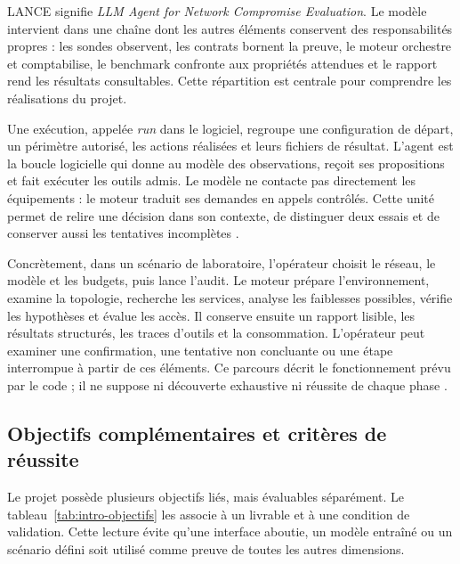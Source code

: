 \documentclass[11pt,a4paper]{article}
\begin{document}
LANCE signifie \emph{LLM Agent for Network Compromise Evaluation}. Le modèle
intervient dans une chaîne dont les autres éléments conservent des
responsabilités propres : les sondes observent, les contrats bornent la preuve,
le moteur orchestre et comptabilise, le benchmark confronte aux propriétés
attendues et le rapport rend les résultats consultables. Cette répartition est
centrale pour comprendre les réalisations du projet.

Une exécution, appelée \emph{run} dans le logiciel, regroupe une configuration
de départ, un périmètre autorisé, les actions réalisées et leurs fichiers de
résultat. L'agent est la boucle logicielle qui donne au modèle des observations,
reçoit ses propositions et fait exécuter les outils admis. Le modèle ne contacte
pas directement les équipements : le moteur traduit ses demandes en appels
contrôlés. Cette unité permet de relire une décision dans son contexte, de
distinguer deux essais et de conserver aussi les tentatives incomplètes
\cite{arch-pipeline,arch-runner}.

Concrètement, dans un scénario de laboratoire, l'opérateur choisit le réseau,
le modèle et les budgets, puis lance l'audit. Le moteur prépare l'environnement,
examine la topologie, recherche les services, analyse les faiblesses possibles,
vérifie les hypothèses et évalue les accès. Il conserve ensuite un rapport
lisible, les résultats structurés, les traces d'outils et la consommation.
L'opérateur peut examiner une confirmation, une tentative non concluante ou
une étape interrompue à partir de ces éléments. Ce parcours décrit le
fonctionnement prévu par le code ; il ne suppose ni découverte exhaustive
ni réussite de chaque phase \cite{arch-pipeline,arch-rapport,app-runs}.

\subsection{Objectifs complémentaires et critères de réussite}
Le projet possède plusieurs objectifs liés, mais évaluables séparément. Le
tableau~\ref{tab:intro-objectifs} les associe à un livrable et à une condition
de validation. Cette lecture évite qu'une interface aboutie, un modèle entraîné
ou un scénario défini soit utilisé comme preuve de toutes les autres dimensions.
\end{document}
